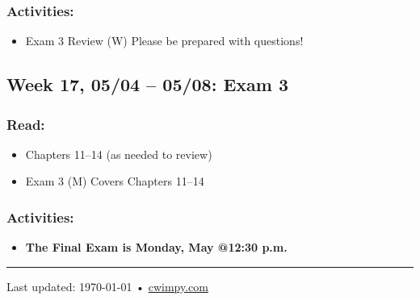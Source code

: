 \documentclass[11pt,]{article}
\providecommand{\tightlist}{%
  \setlength{\itemsep}{0pt}\setlength{\parskip}{0pt}}
\newcommand{\HRule}{\rule{\linewidth}{0.5mm}}
\begin{document}
\hypertarget{activities-2}{%
\subsubsection{Activities:}\label{activities-2}}

\begin{itemize}
\tightlist
\item
  Exam 3 Review (W) \textbar{} Please be prepared with questions!
\end{itemize}

\hypertarget{week-17-0504-0508-exam-3}{%
\subsection{Week 17, 05/04 -- 05/08: Exam
3}\label{week-17-0504-0508-exam-3}}

\hypertarget{read-15}{%
\subsubsection{Read:}\label{read-15}}

\begin{itemize}
\item
  Chapters 11--14 (as needed to review)
\item
  Exam 3 (M) \textbar{} Covers Chapters 11--14
\end{itemize}

\hypertarget{activities-3}{%
\subsubsection{Activities:}\label{activities-3}}

\begin{itemize}
\tightlist
\item
  \textbf{The Final Exam is Monday, May  @12:30 p.m.}
\end{itemize}





\vfill{}
\vfill{}
\HRule
\begin{center}
	{\scriptsize  Last updated: \today\- •\- \href{https://cwimpy.com}{cwimpy.com}}
 \end{center}
\end{document}
